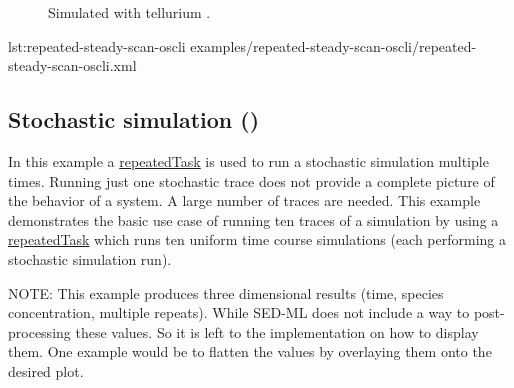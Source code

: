\begin{figure}[ht!]
\begin{minipage}{0.47\textwidth}
        \caption{Simulated with tellurium \citep{tellurium}.}
    \end{minipage}
    \label{fig:repeated-steady-scan-oscli}
\end{figure}

{lst:repeated-steady-scan-oscli}
{examples/repeated-steady-scan-oscli/repeated-steady-scan-oscli.xml}


\subsection{Stochastic simulation ()}
In this example a \hyperref[class:repeatedTask]{repeatedTask} is used to run a stochastic simulation multiple times.
Running just one stochastic trace does not provide a complete picture of the behavior of a system. A large number of traces are needed. This example demonstrates the basic use case of running ten traces of a simulation by using a \hyperref[class:repeatedTask]{repeatedTask} which runs ten uniform time course simulations (each performing a stochastic simulation run).

NOTE: This example produces three dimensional results (time, species concentration, multiple repeats). While SED-ML \currentLV does not include a way to post-processing these values. So it is left to the implementation on how to display them. One example would be to flatten the values by overlaying them onto the desired plot. 

